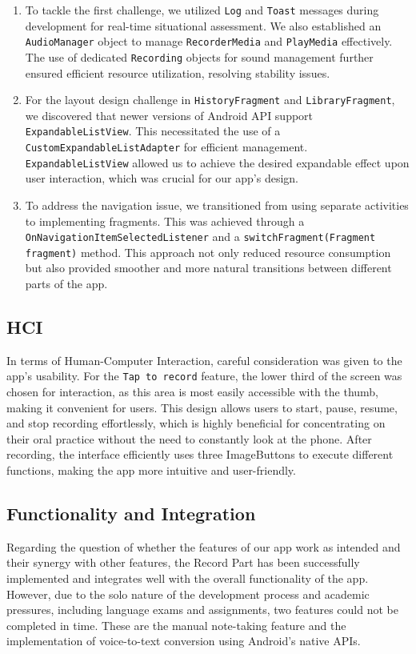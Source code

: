 \documentclass[conference,10pt,letterpaper]{IEEEtran}
\begin{document}
	\begin{enumerate}
		\item To tackle the first challenge, we utilized \texttt{Log} and \texttt{Toast} messages during development for real-time situational assessment. We also established an \texttt{AudioManager} object to manage \texttt{RecorderMedia} and \texttt{PlayMedia} effectively. The use of dedicated \texttt{Recording} objects for sound management further ensured efficient resource utilization, resolving stability issues.
		
		\item For the layout design challenge in \texttt{HistoryFragment} and \texttt{LibraryFragment}, we discovered that newer versions of Android API support \texttt{ExpandableListView}. This necessitated the use of a \texttt{CustomExpandableListAdapter} for efficient management. \texttt{ExpandableListView} allowed us to achieve the desired expandable effect upon user interaction, which was crucial for our app’s design.
		
		\item To address the navigation issue, we transitioned from using separate activities to implementing fragments. This was achieved through a \texttt{OnNavigationItemSelectedListener} and a \texttt{switchFragment(Fragment fragment)} method. This approach not only reduced resource consumption but also provided smoother and more natural transitions between different parts of the app.
	\end{enumerate}
	
	\subsection{HCI}
	In terms of Human-Computer Interaction, careful consideration was given to the app's usability. For the \texttt{Tap to record} feature, the lower third of the screen was chosen for interaction, as this area is most easily accessible with the thumb, making it convenient for users. This design allows users to start, pause, resume, and stop recording effortlessly, which is highly beneficial for concentrating on their oral practice without the need to constantly look at the phone. After recording, the interface efficiently uses three ImageButtons to execute different functions, making the app more intuitive and user-friendly.
	
	\subsection{Functionality and Integration}
	Regarding the question of whether the features of our app work as intended and their synergy with other features, the Record Part has been successfully implemented and integrates well with the overall functionality of the app. However, due to the solo nature of the development process and academic pressures, including language exams and assignments, two features could not be completed in time. These are the manual note-taking feature and the implementation of voice-to-text conversion using Android's native APIs.
	
\end{document}
